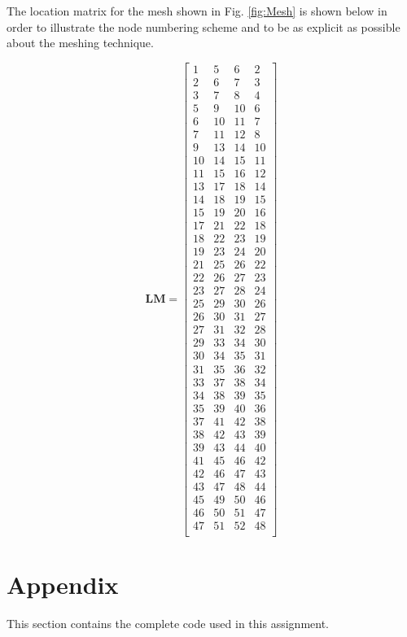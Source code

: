\documentclass[10pt]{article}
\begin{document}
The location matrix for the mesh shown in Fig. \ref{fig:Mesh} is shown below in order to illustrate the node numbering scheme and to be as explicit as possible about the meshing technique.

\begin{equation}
\textbf{LM}=
\begin{bmatrix}
1 & 5 & 6 & 2 \\
2 & 6 & 7 & 3 \\
3 & 7 & 8 & 4 \\
5 & 9 & 10 & 6 \\
6 & 10 & 11 & 7 \\
7 & 11 & 12 & 8 \\
9 & 13 & 14 & 10 \\
10 & 14 & 15 & 11 \\
11 & 15 & 16 & 12 \\
13 & 17 & 18 & 14 \\
14 & 18 & 19 & 15 \\
15 & 19 & 20 & 16 \\
17 & 21 & 22 & 18 \\
18 & 22 & 23 & 19 \\
19 & 23 & 24 & 20 \\
21 & 25 & 26 & 22 \\
22 & 26 & 27 & 23 \\
23 & 27 & 28 & 24 \\
25 & 29 & 30 & 26 \\
26 & 30 & 31 & 27 \\
27 & 31 & 32 & 28 \\
29 & 33 & 34 & 30 \\
30 & 34 & 35 & 31 \\
31 & 35 & 36 & 32 \\
33 & 37 & 38 & 34 \\
34 & 38 & 39 & 35 \\
35 & 39 & 40 & 36 \\
37 & 41 & 42 & 38 \\
38 & 42 & 43 & 39 \\
39 & 43 & 44 & 40 \\
41 & 45 & 46 & 42 \\
42 & 46 & 47 & 43 \\
43 & 47 & 48 & 44 \\
45 & 49 & 50 & 46 \\
46 & 50 & 51 & 47 \\
47 & 51 & 52 & 48 \\
\end{bmatrix}
\end{equation}

\section{Appendix}

This section contains the complete code used in this assignment. 

\end{document}

